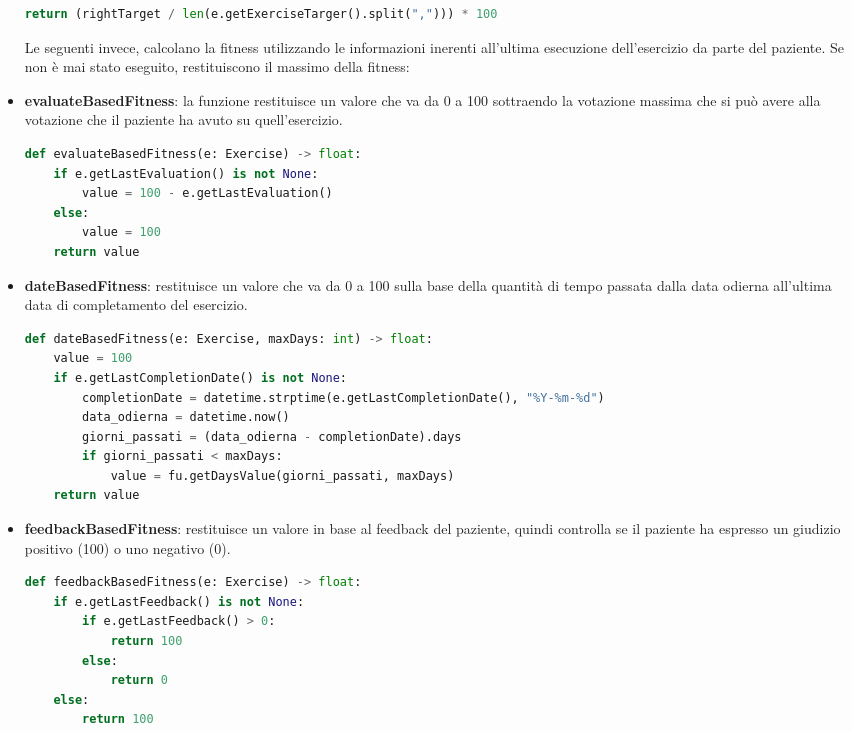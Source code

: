 \documentclass{article}
\begin{document}
\begin{itemize}
\begin{lstlisting}[language = Python]
    return (rightTarget / len(e.getExerciseTarger().split(","))) * 100
\end{lstlisting}

\pagebreak

Le seguenti invece, calcolano la fitness utilizzando le informazioni inerenti all'ultima esecuzione dell'esercizio da parte del paziente. Se non è mai stato eseguito, restituiscono il massimo della fitness:


\item\textbf{evaluateBasedFitness}: la funzione restituisce un valore che va da 0 a 100 sottraendo la votazione massima che si può avere alla votazione che il paziente ha avuto su quell'esercizio.
\begin{lstlisting}[language = Python]
    def evaluateBasedFitness(e: Exercise) -> float:
    if e.getLastEvaluation() is not None:
        value = 100 - e.getLastEvaluation()
    else:
        value = 100
    return value
\end{lstlisting}

\item\textbf{dateBasedFitness}: restituisce un valore che va da 0 a 100 sulla base della quantità di tempo passata dalla data odierna all'ultima data di completamento del esercizio.
\begin{lstlisting}[language = Python]
    def dateBasedFitness(e: Exercise, maxDays: int) -> float:
    value = 100
    if e.getLastCompletionDate() is not None:
        completionDate = datetime.strptime(e.getLastCompletionDate(), "%Y-%m-%d")
        data_odierna = datetime.now()
        giorni_passati = (data_odierna - completionDate).days
        if giorni_passati < maxDays:
            value = fu.getDaysValue(giorni_passati, maxDays)
    return value
\end{lstlisting}


\item\textbf{feedbackBasedFitness}: restituisce un valore in base al feedback del paziente, quindi controlla se il paziente ha espresso un giudizio positivo (100) o uno negativo (0).
\begin{lstlisting}[language = Python]
    def feedbackBasedFitness(e: Exercise) -> float:
    if e.getLastFeedback() is not None:
        if e.getLastFeedback() > 0:
            return 100
        else:
            return 0
    else:
        return 100
\end{lstlisting}


\end{itemize}
\end{document}
